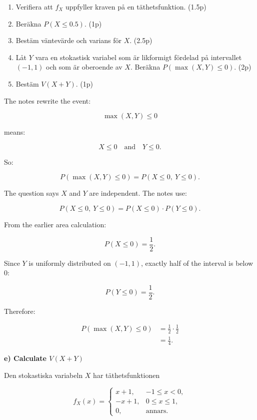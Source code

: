 \documentclass[10pt]{article}
\begin{document}
\begin{enumerate}[label=\alph*)]
\item Verifiera att \(f_X\) uppfyller kraven på en
täthetsfunktion.
\hfill (1.5p)

\item Beräkna \(P(X\le 0.5)\).
\hfill (1p)

\item Bestäm väntevärde och varians för \(X\).
\hfill (2.5p)

\item Låt \(Y\) vara en stokastisk variabel som är
likformigt fördelad på intervallet \((-1,1)\) och som
är oberoende av \(X\).
Beräkna \(P(\max(X,Y)\le 0)\).
\hfill (2p)

\item Bestäm \(V(X+Y)\).
\hfill (1p)
\end{enumerate}

The notes rewrite the event:

\[
\max(X,Y)\le 0
\]

means:

\[
X\le 0
\quad \text{and} \quad
Y\le 0.
\]

So:

\[
P(\max(X,Y)\le 0)
=
P(X\le 0,\ Y\le 0).
\]

The question says \(X\) and \(Y\) are independent.
The notes use:

\[
P(X\le 0,\ Y\le 0)
=
P(X\le 0)\cdot P(Y\le 0).
\]

From the earlier area calculation:

\[
P(X\le 0)=\frac{1}{2}.
\]

Since \(Y\) is uniformly distributed on \((-1,1)\),
exactly half of the interval is below \(0\):

\[
P(Y\le 0)=\frac{1}{2}.
\]

Therefore:

\begin{align*}
P(\max(X,Y)\le 0)
&=
\frac{1}{2}\cdot\frac{1}{2} \\[2mm]
&=
\frac{1}{4}.
\end{align*}

\textbf{e) Calculate \(V(X+Y)\)}

Den stokastiska variabeln \(X\) har täthetsfunktionen

\[
f_X(x)=
\begin{cases}
x+1, & -1\le x<0,\\
-x+1, & 0\le x\le 1,\\
0, & \text{annars}.
\end{cases}
\]
\end{document}
